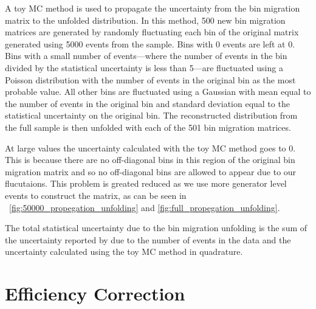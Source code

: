 A toy MC method is used to propagate the uncertainty from the bin migration
matrix to the unfolded distribution. In this method, \num{500} new bin
migration matrices are generated by randomly fluctuating each bin of the
original matrix generated using \num{5000} events from the \POWHEG sample. Bins
with \num{0} events are left at \num{0}. Bins with a small number of
events---where the number of events in the bin divided by the statistical
uncertainty is less than \num{5}---are fluctuated using a Poisson distribution
with the number of events in the original bin as the most probable value. All
other bins are fluctuated using a Gaussian with mean equal to the number of
events in the original bin and standard deviation equal to the statistical
uncertainty on the original bin. The reconstructed \phistar distribution from
the full \MADGRAPH sample is then unfolded with each of the \num{501} bin
migration matrices. 


At large \phistar values the uncertainty calculated with the toy MC method goes
to \num{0}. This is because there are no off-diagonal bins in this region of
the original bin migration matrix and so no off-diagonal bins are allowed to
appear due to our flucutaions. This problem is greated reduced as we use more
generator level events to construct the matrix, as can be seen in
\FIGS~\ref{fig:50000_propegation_unfolding} and
\ref{fig:full_propegation_unfolding}.


The total statistical uncertainty due to the bin migration unfolding is the
sum of the uncertainty reported by \RooUnfold due to the number of events in
the data and the uncertainty calculated using the toy MC method in quadrature.

\section{Efficiency Correction}

